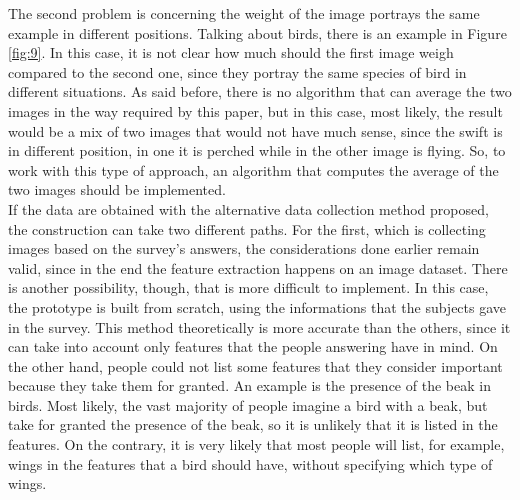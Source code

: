 \documentclass[conference]{IEEEtran}
\begin{document}
			\noindent The second problem is concerning the weight of the image portrays the same example in different positions. Talking about birds, there is an example in Figure \ref{fig:9}. In this case, it is not clear 
			how much should the first image weigh compared to the second one, since they portray the same species of bird in different situations. As said before, there is no algorithm that can average the two images in the 
			way required by this paper, but in this case, most likely, the result would be a mix of two images that would not have much sense, since the swift is in different position, in one it is perched while in the other 
			image is flying. So, to work with this type of approach, an algorithm that computes the average of the two images should be implemented.\\
			If the data are obtained with the alternative data collection method proposed, the construction can take two different paths. For the first, which is collecting images based on the survey's answers, the 
			considerations done earlier remain valid, since in the end the feature extraction happens on an image dataset. There is another possibility, though, that is more difficult to implement. In this case, the 
			prototype is built from scratch, using the informations that the subjects gave in the survey. This method theoretically is more accurate than the others, since it can take into account only features 
			that the people answering have in mind. On the other hand, people could not list some features that they consider important because they take them for granted. An example is the presence of the beak in birds. 
			Most likely, the vast majority of people imagine a bird with a beak, but take for granted the presence of the beak, so it is unlikely that it is listed in the features. On the contrary, it is very likely that 
			most people will list, for example, wings in the features that a bird should have, without specifying which type of wings. 
			
\end{document}
